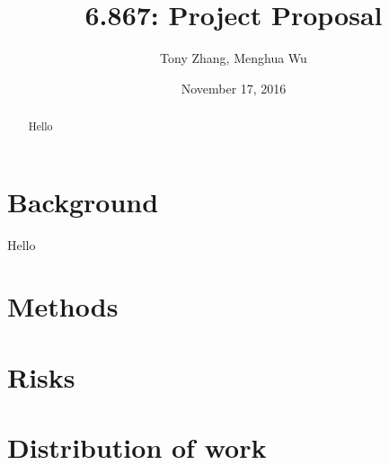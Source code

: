 \documentclass{article}
\title{6.867: Project Proposal}
\date{November 17, 2016}
\author{Tony Zhang, Menghua Wu}
\begin{document}
\maketitle


\begin{abstract}
Hello
\end{abstract}


\section{Background}
Hello

\section{Methods}

\section{Risks}

\section{Distribution of work}

\end{document}
